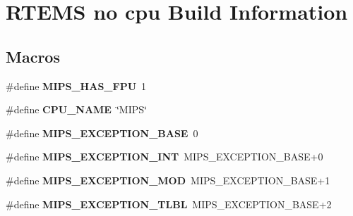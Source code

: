 \hypertarget{group__RTEMSScoreCPUMIPSBuild}{}\section{R\+T\+E\+MS no cpu Build Information}
\label{group__RTEMSScoreCPUMIPSBuild}
\subsection*{Macros}
\begin{DoxyCompactItemize}
\item 
\mbox{\label{group__RTEMSScoreCPUMIPSBuild_gac4ed01a5dbc224e283efa7e25b4384b7}} 
\#define {\bfseries M\+I\+P\+S\+\_\+\+H\+A\+S\+\_\+\+F\+PU}~1
\item 
\mbox{\label{group__RTEMSScoreCPUMIPSBuild_ga65a2f3e765349445fd8ad6a44d7e498a}} 
\#define {\bfseries C\+P\+U\+\_\+\+N\+A\+ME}~\char`\"{}M\+I\+PS\char`\"{}
\item 
\mbox{\label{group__RTEMSScoreCPUMIPSBuild_ga4652403282382d90637747777a394391}} 
\#define {\bfseries M\+I\+P\+S\+\_\+\+E\+X\+C\+E\+P\+T\+I\+O\+N\+\_\+\+B\+A\+SE}~0
\item 
\mbox{\label{group__RTEMSScoreCPUMIPSBuild_gac65fd4de55fd32af9f18f08859b286e1}} 
\#define {\bfseries M\+I\+P\+S\+\_\+\+E\+X\+C\+E\+P\+T\+I\+O\+N\+\_\+\+I\+NT}~M\+I\+P\+S\+\_\+\+E\+X\+C\+E\+P\+T\+I\+O\+N\+\_\+\+B\+A\+SE+0
\item 
\mbox{\label{group__RTEMSScoreCPUMIPSBuild_ga8adc6e322472a6c6068d8446a27e44d1}} 
\#define {\bfseries M\+I\+P\+S\+\_\+\+E\+X\+C\+E\+P\+T\+I\+O\+N\+\_\+\+M\+OD}~M\+I\+P\+S\+\_\+\+E\+X\+C\+E\+P\+T\+I\+O\+N\+\_\+\+B\+A\+SE+1
\item 
\mbox{\label{group__RTEMSScoreCPUMIPSBuild_ga20dcecfa572377d8d0c2e9fbeeb11310}} 
\#define {\bfseries M\+I\+P\+S\+\_\+\+E\+X\+C\+E\+P\+T\+I\+O\+N\+\_\+\+T\+L\+BL}~M\+I\+P\+S\+\_\+\+E\+X\+C\+E\+P\+T\+I\+O\+N\+\_\+\+B\+A\+SE+2
\item 
\mbox{\label{group__RTEMSScoreCPUMIPSBuild_ga9d618b1a786bf3235ba34b2a765c5102}} 

\end{DoxyCompactItemize}

